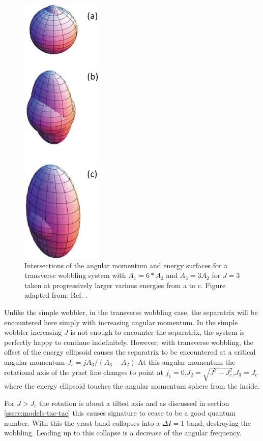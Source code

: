 \begin{figure}[t!]
\centerline{\includegraphics[height=0.4\textheight]{./img/c2/simple_am_orbits.png}}
	\caption{Intersections of the angular momentum and energy surfaces for a transverse wobbling system with $A_1=6*A_2$ and $A_3=3A_2$ for $J=3$ taken at progressively larger various energies from a to c. Figure adapted from: Ref. \cite{frauendorfTransverseWobbling}.\label{fig:chp2-transverse-am-orbits}}
\end{figure}

Unlike the simple wobbler, in the transverse wobbling case, the separatrix will be encountered here simply with increasing angular momentum. In the simple wobbler increasing $J$ is not enough to encounter the separatrix, the system is perfectly happy to continue indefinitely. However, with transverse wobbling, the offset of the energy ellipsoid causes the separatrix to be encountered at a critical angular momentum $J_c=jA_3/(A_3-A_2)$ At this angular momentum the rotational axis of the yrast line changes to point at $j_1=0$,$J_2=\sqrt{J^2-J^2_c}$,$J_3=J_c$ where the energy ellipsoid touches the angular momentum sphere from the inside.

For $J>J_c$ the rotation is about a tilted axis and as discussed in section \ref{sssec:models-tac-tac} this causes signature to cease to be a good quantum number. With this the yrast band collapses into a $\Delta{}I=1$ band, destroying the wobbling. Leading up to this collapse is a decrease of the angular frequency.

